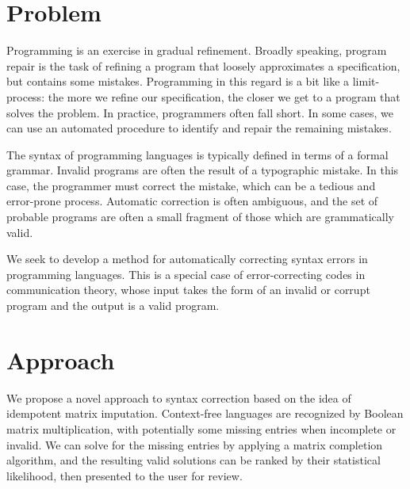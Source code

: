 \documentclass[sigplan,screen]{acmart}
\begin{document}
\section{Problem}




Programming is an exercise in gradual refinement. Broadly speaking, program repair is the task of refining a program that loosely approximates a specification, but contains some mistakes. Programming in this regard is a bit like a limit-process: the more we refine our specification, the closer we get to a program that solves the problem. In practice, programmers often fall short. In some cases, we can use an automated procedure to identify and repair the remaining mistakes.

The syntax of programming languages is typically defined in terms of a formal grammar. Invalid programs are often the result of a typographic mistake. In this case, the programmer must correct the mistake, which can be a tedious and error-prone process. Automatic correction is often ambiguous, and the set of probable programs are often a small fragment of those which are grammatically valid.

We seek to develop a method for automatically correcting syntax errors in programming languages. This is a special case of error-correcting codes in communication theory, whose input takes the form of an invalid or corrupt program and the output is a valid program.

\section{Approach}


We propose a novel approach to syntax correction based on the idea of idempotent matrix imputation. Context-free languages are recognized by Boolean matrix multiplication, with potentially some missing entries when incomplete or invalid. We can solve for the missing entries by applying a matrix completion algorithm, and the resulting valid solutions can be ranked by their statistical likelihood, then presented to the user for review.
\end{document}
